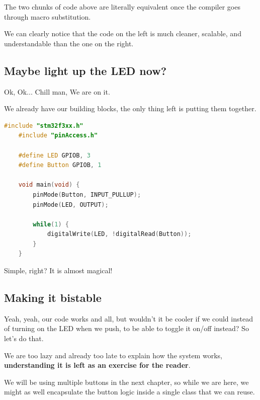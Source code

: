 \documentclass{article}
\begin{document}
The two chunks of code above are literally equivalent once the compiler goes through macro substitution. 

We can clearly notice that the code on the left is much cleaner, scalable, and understandable than the one on the right.

\subsection{Maybe light up the LED now?}

Ok, Ok... Chill man, We are on it.

We already have our building blocks, the only thing left is putting them together.

\begin{lstlisting}[language=C++, caption={Simple LED}]
    #include "stm32f3xx.h"
    #include "pinAccess.h"

    #define LED GPIOB, 3
    #define Button GPIOB, 1

    void main(void) {
        pinMode(Button, INPUT_PULLUP);
        pinMode(LED, OUTPUT);

        while(1) {
            digitalWrite(LED, !digitalRead(Button));
        }
    }
\end{lstlisting}

Simple, right? It is almost magical!

\subsection{Making it bistable}

Yeah, yeah, our code works and all, but wouldn't it be cooler if we could instead of turning on the LED when we push, to be able to toggle it on/off instead? So let's do that.

We are too lazy and already too late to explain how the system works, \textbf{understanding it is left as an exercise for the reader}.

We will be using multiple buttons in the next chapter, so while we are here, we might as well encapsulate the button logic inside a single class that we can reuse.
\end{document}
